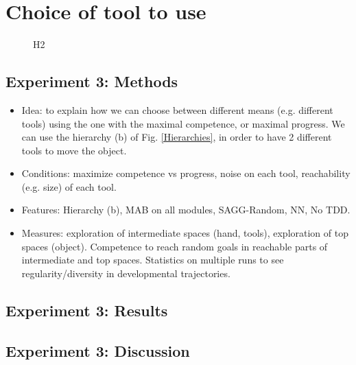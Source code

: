 \documentclass[conference]{include/IEEEtran}
\begin{document}

%
	
\section{Choice of tool to use}

	\begin{figure}[!t]
		\center
		
		\caption{H2}
		\label{H2}					
	\end{figure}
	

	\subsection{Experiment 3: Methods}	
		
		\begin{itemize}
			\item Idea: to explain how we can choose between different means (e.g. different tools) using the one with the maximal competence, or maximal progress.
					We can use the hierarchy (b) of Fig. \ref{Hierarchies}, in order to have 2 different tools to move the object.
			
			\item Conditions: maximize competence vs progress, noise on each tool, reachability (e.g. size) of each tool.
			
			\item Features: Hierarchy (b), MAB on all modules, SAGG-Random, NN, No TDD.
			
			\item Measures: exploration of intermediate spaces (hand, tools), exploration of top spaces (object). Competence to reach random goals in reachable parts of intermediate and top spaces. 
					Statistics on multiple runs to see regularity/diversity in developmental trajectories.
		\end{itemize}
		

	\subsection{Experiment 3: Results}
	
		
	
	\subsection{Experiment 3: Discussion}	
	
	
\end{document}
